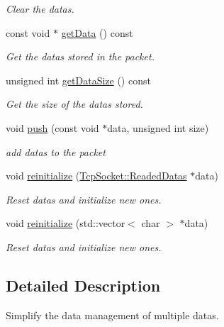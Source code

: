 \begin{DoxyCompactItemize}
\begin{DoxyCompactList}\small\item\em Clear the datas. \end{DoxyCompactList}\item 
const void $\ast$ \hyperlink{classmognetwork_1_1_packet_afb66469155c26ec3f1a9c77a7c23841b}{get\-Data} () const 
\begin{DoxyCompactList}\small\item\em Get the datas stored in the packet. \end{DoxyCompactList}\item 
unsigned int \hyperlink{classmognetwork_1_1_packet_a3f27100558a578cea57c0b0502b6e9c9}{get\-Data\-Size} () const 
\begin{DoxyCompactList}\small\item\em Get the size of the datas stored. \end{DoxyCompactList}\item 
void \hyperlink{classmognetwork_1_1_packet_a2d60777d07c0f1b0e97060a17b9bed43}{push} (const void $\ast$data, unsigned int size)
\begin{DoxyCompactList}\small\item\em add datas to the packet \end{DoxyCompactList}\item 
void \hyperlink{classmognetwork_1_1_packet_a34feb9cd0a9fc669b6d252d610ba7903}{reinitialize} (\hyperlink{structmognetwork_1_1_tcp_socket_1_1_readed_datas}{Tcp\-Socket\-::\-Readed\-Datas} $\ast$data)
\begin{DoxyCompactList}\small\item\em Reset datas and initialize new ones. \end{DoxyCompactList}\item 
void \hyperlink{classmognetwork_1_1_packet_ae6fb04a3e747354996a6d1eeae80e06b}{reinitialize} (std\-::vector$<$ char $>$ $\ast$data)
\begin{DoxyCompactList}\small\item\em Reset datas and initialize new ones. \end{DoxyCompactList}\end{DoxyCompactItemize}


\subsection{Detailed Description}
Simplify the data management of multiple datas. 

